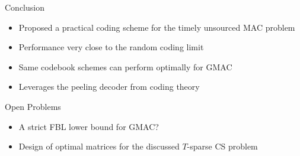 \begin{frame}{Conclusion}
\begin{itemize}  
  \item Proposed a practical coding scheme for the timely unsourced MAC problem
  \item Performance very close to the random coding limit
  \item Same codebook schemes can perform optimally for GMAC
  \item Leverages the peeling decoder from coding theory  
\end{itemize}

\pause
Open Problems
\begin{itemize}
  \item A strict FBL lower bound for GMAC?
  \item Design of optimal matrices for the discussed $T$-sparse CS problem
\end{itemize}
\end{frame}




